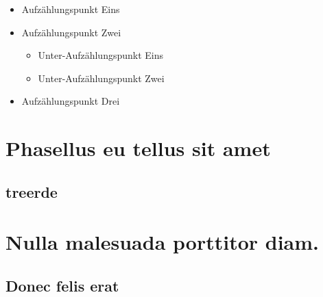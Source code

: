 \documentclass[%
  a4paper,%
  12pt,%
  blue,%
  ]{tubsartcl}
\begin{document}
\begin{itemize}
  \item Aufzählungspunkt Eins
  \item Aufzählungspunkt Zwei
    \begin{itemize}
      \item Unter-Aufzählungspunkt Eins
      \item Unter-Aufzählungspunkt Zwei
    \end{itemize}
  \item Aufzählungspunkt Drei
\end{itemize}

\section{Phasellus eu tellus sit amet}
\subsection{treerde}
\lipsum[2-5]

\section{Nulla malesuada porttitor diam.}

\lipsum[1-3]

\subsection{Donec felis erat}

\lipsum[4-7]
\end{document}
